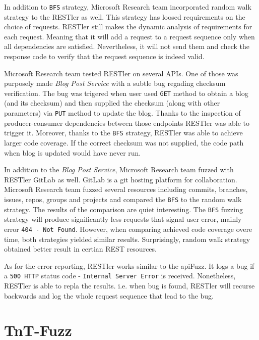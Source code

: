 In addition to \texttt{BFS} strategy, Microsoft Research team incorporated random walk strategy to the RESTler as well. This strategy has loosed requirements on the choice of requests. RESTler still makes the dynamic analysis of requirements for each request. Meaning that it will add a request to a request sequence only when all dependencies are satisfied. Nevertheless, it will not send them and check the response code to verify that the request sequence is indeed valid.

Microsoft Research team tested RESTler on several APIs. One of those was purposely made \textit{Blog Post Service} with a subtle bug regading checksum verification. The bug was trigered when user used \texttt{GET} method to obtain a blog (and its checksum) and then supplied the checksum (along with other parameters) via \texttt{PUT} method to update the blog. Thanks to the inspection of producer-consumer dependencies between those endpoints RESTler was able to trigger it. Moreover, thanks to the \texttt{BFS} strategy, RESTler was able to achieve larger code coverage. If the correct checksum was not supplied, the code path when blog is updated would have never run.

In addition to the \textit{Blog Post Service}, Microsoft Research team fuzzed with RESTler GitLab as well. GitLab is a git hosting platform for collaboration. Microsoft Research team fuzzed several resources including commits, branches, issues, repos, groups and projects and compared the \texttt{BFS} to the random walk strategy. The results of the comparison are quiet interesting. The \texttt{BFS} fuzzing strategy will produce significantly less requests that signal user error, mainly error \texttt{404 - Not Found}. However, when comparing achieved code coverage overe time, both strategies yielded similar results. Surprisingly, random walk strategy obtained better result in certian REST resources.

As for the error reporting, RESTler works similar to the apiFuzz. It logs a bug if a \texttt{500 HTTP} status code - \texttt{Internal Server Error} is received. Nonetheless, RESTler is able to repla the results. i.e. when bug is found, RESTler will recurse backwards and log the whole request sequence that lead to the bug.

\section{TnT-Fuzz}


